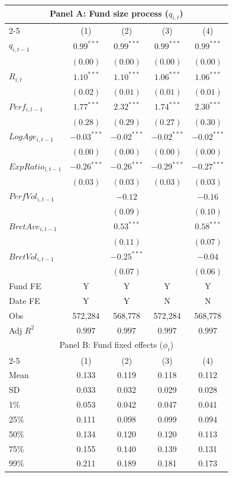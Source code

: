 \documentclass[
]{article}
\author{}
\date{\vspace{-2.5em}}
\begin{document}
\begin{tabular}{lcccc}
  \toprule \multicolumn{5}{c}{Panel A: Fund size process ($q_{i,t}$)} \\
 
 \cmidrule(l){2-5}  \vspace{5pt} & (1) & (2) & (3) & (4) \\ 
  $q_{i,t-1}$ & $0.99^{***}$ & $0.99^{***}$ & $0.99^{***}$ & $0.99^{***}$ \\ 
   & $(0.00)$ & $(0.00)$ & $(0.00)$ & $(0.00)$ \\ 
  $R_{i,t}$ & $1.10^{***}$ & $1.10^{***}$ & $1.06^{***}$ & $1.06^{***}$ \\ 
   & $(0.02)$ & $(0.01)$ & $(0.01)$ & $(0.01)$ \\ 
  $Perf_{i,t-1}$ & $1.77^{***}$ & $2.32^{***}$ & $1.74^{***}$ & $2.30^{***}$ \\ 
   & $(0.28)$ & $(0.29)$ & $(0.27)$ & $(0.30)$ \\ 
  $LogAge_{i,t-1}$ & $-0.03^{***}$ & $-0.02^{***}$ & $-0.02^{***}$ & $-0.02^{***}$ \\ 
   & $(0.00)$ & $(0.00)$ & $(0.00)$ & $(0.00)$ \\ 
  $ExpRatio_{i,t-1}$ & $-0.26^{***}$ & $-0.26^{***}$ & $-0.29^{***}$ & $-0.27^{***}$ \\ 
   & $(0.03)$ & $(0.03)$ & $(0.03)$ & $(0.03)$ \\ 
  $PerfVol_{i,t-1}$ &  & $-0.12$ &  & $-0.16$ \\ 
   &  & $(0.09)$ &  & $(0.10)$ \\ 
  $BretAve_{i,t-1}$ &  & $0.53^{***}$ &  & $0.58^{***}$ \\ 
   &  & $(0.11)$ &  & $(0.07)$ \\ 
  $BretVol_{i,t-1}$ &  & $-0.25^{***}$ &  & $-0.04$ \\ 
   \vspace{5pt} &  & $(0.07)$ &  & $(0.06)$ \\ 
  Fund FE & Y & Y & Y & Y \\ 
   \vspace{5pt}Date FE & Y & Y & N & N \\ 
  Obs & 572,284 & 568,778 & 572,284 & 568,778 \\ 
  Adj $R^2$ & $0.997$ & $0.997$ & $0.997$ & $0.997$ \\ 
   \hline \multicolumn{5}{c}{Panel B: Fund fixed effects ($\phi_i$)} \\
 
 \cmidrule(l){2-5} \vspace{5pt} 
 & (1) & (2) & (3) & (4) \\ 
  Mean & 0.133 & 0.119 & 0.118 & 0.112 \\ 
   \vspace{5pt}SD & 0.033 & 0.032 & 0.029 & 0.028 \\ 
  1\% & 0.053 & 0.042 & 0.047 & 0.041 \\ 
  25\% & 0.111 & 0.098 & 0.099 & 0.094 \\ 
  50\% & 0.134 & 0.120 & 0.120 & 0.113 \\ 
  75\% & 0.155 & 0.140 & 0.139 & 0.131 \\ 
  99\% & 0.211 & 0.189 & 0.181 & 0.173 \\ 
   \bottomrule 
\end{tabular}
\end{document}
